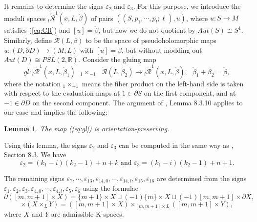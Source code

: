 \documentclass[a4paper]{article}
\newtheorem{lemma}[theorem]{Lemma}
\numberwithin{equation}{section}
\begin{document}
It remains to determine the signs $\varepsilon_2$ and $\varepsilon_3$. For this purpose, we introduce the moduli spaces ${}_l\widetilde{\mathcal{R}}^1(x,L,\ring{\beta})$ of pairs $\left((S,p_1,\cdots,p_l;\ell),u\right)$, where $u:S\rightarrow M$ satisfies (\ref{eq:CR}) and $[u]=\ring{\beta}$, but now we do not quotient by $\mathit{Aut}(S)\cong S^1$. Similarly, define $\widetilde{\mathcal{R}}(L,\beta)$ to be the space of pseudoholomorphic maps $u:(D,\partial D)\rightarrow(M,L)$ with $[u]=\beta$, but without modding out $\mathit{Aut}(D)\cong\mathit{PSL}(2,\mathbb{R})$. Consider the gluing map
\begin{equation}\label{eq:gl}
\mathit{gl}:{}_l\widetilde{\mathcal{R}}^1(x,L,\ring{\beta}_1)\textrm{ }{{}_1\times_{-1}}\textrm{ }\widetilde{\mathcal{R}}(L,\beta_2)\rightarrow{}_l\widetilde{\mathcal{R}}^1(x,L,\ring{\beta}),\textrm{ }\ring{\beta}_1+\beta_2=\ring{\beta},
\end{equation}
where the notation ${}_1\times_{-1}$ means the fiber product on the left-hand side is taken with respect to the evaluation maps at $1\in\partial S$ on the first component, and at $-1\in\partial D$ on the second component. The argument of \cite{fooo1}, Lemma 8.3.10 applies to our case and implies the following:

\begin{lemma}
The map (\ref{eq:gl}) is orientation-preserving.
\end{lemma}

Using this lemma, the signs $\varepsilon_2$ and $\varepsilon_3$ can be computed in the same way as \cite{fooo1}, Section 8.3. We have
\begin{equation}
\varepsilon_2=(k_1-i)(k_2-1)+n+k\textrm{ and }\varepsilon_3=(k_1-i)(k_2-1)+n+1.
\end{equation}

The remaining signs $\varepsilon_7,\cdots,\varepsilon_{13},\varepsilon_{14,0},\cdots,\varepsilon_{14,l},\varepsilon_{15},\varepsilon_{16}$ are determined from the signs $\varepsilon_1,\varepsilon_2,\varepsilon_3,\varepsilon_{4,0},\cdots,\varepsilon_{4,l},\varepsilon_5,\varepsilon_6$ using the formulae
\begin{equation}
\partial([m,m+1]\times X)=\{m+1\}\times X\sqcup(-1)\{m\}\times X\sqcup(-1)[m,m+1]\times\partial X,
\end{equation}
\begin{equation}
[m,m+1]\times(X\times_LY)=([m,m+1]\times X)\times_{[m,m+1]\times L}([m,m+1]\times Y),
\end{equation}
where $X$ and $Y$ are admissible K-spaces.
\end{document}
